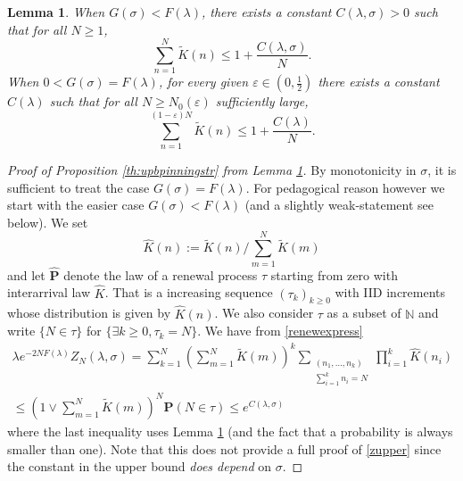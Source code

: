 \documentclass[reqno,11pt]{amsart}
\numberwithin{equation}{section}
\newcommand{\bbN}{{\ensuremath{\mathbb N}} }
\newcommand{\gep}{\varepsilon}       %
\newcommand{\gl}{\lambda}
\newcommand{\gs}{\sigma}
\newcommand{\bP}{{\ensuremath{\mathbf P}} }
\newtheorem{lemma}[theorem]{Lemma}
\renewcommand{\tilde}{\widetilde}
\renewcommand{\hat}{\widehat}
\newcommand{\sumtwo}[2]{\sum_{\substack{#1 \\ #2}}} %
\begin{document}
\begin{lemma} \label{th:renewestimate}
When $G(\sigma)< F(\lambda)$, there exists a constant $C(\lambda, \sigma)>0$ such that for all $N\geq 1$, 
\begin{equation}
 \sum_{n=1}^{N} \widetilde{K}(n)\leq 1+\frac{C(\lambda, \sigma)}{N}.
\end{equation}
When $0<G(\sigma)= F(\lambda)$, for every given $\gep \in (0, \frac{1}{2})$  there exists a constant $C(\gl)$ such that for all $N \ge N_0(\gep)$ sufficiently large,
\begin{equation}
\sum_{n=1}^{ (1-\gep)N} \widetilde{K}(n)\leq 1+\frac{C(\gl)}{N}  .
\end{equation}
\end{lemma}



\begin{proof}[Proof of Proposition \ref{th:upbpinningstr} from Lemma \ref{th:renewestimate}]
By monotonicity in $\gs$,
it is sufficient to treat the case $G(\sigma)= F(\lambda)$.
For pedagogical reason however we start with the easier case $G(\sigma)< F(\lambda)$ (and a slightly weak-statement see below).
We set 
\begin{equation}\label{defhatK}
 \hat K(n):= \tilde K(n)/ \sum_{m=1}^N \tilde K(m)
\end{equation}
and let $\hat \bP$ denote the law of a renewal process $\tau$ starting from zero with interarrival law $\hat K$. That is a increasing sequence $(\tau_k)_{k\ge 0}$ with IID increments whose distribution is given by $\hat K(n)$. We also consider $\tau$ as a subset of $\bbN$ and write
$\{N\in \tau\}$ for $\{\exists k\ge 0, \tau_k=N\}$.
We have from \eqref{renewexpress}
\begin{multline}\label{renewexpress1}
  \gl e^{-2N F(\gl)} Z_N(\gl,\sigma)= \sum_{k=1}^N \left(\sum_{m=1}^N \tilde K(m)\right)^k \sumtwo{(n_1,\dots,n_k)}{ \sum_{i=1}^k n_i=N} \prod_{i=1}^{k} \hat K(n_i)\\ \le \left(1 \vee \sum_{m=1}^N \tilde K(m)\right)^N \hat \bP\left( N  \in \tau\right)\le
  e^{C(\lambda, \sigma)}
\end{multline}
where the last inequality uses Lemma \ref{th:renewestimate} (and the fact that a probability is always smaller than one).
Note that this does not provide a full proof of \eqref{zupper} since the constant in the upper bound \textit{does depend} on $\gs$.

\medskip


\end{proof}
\end{document}
